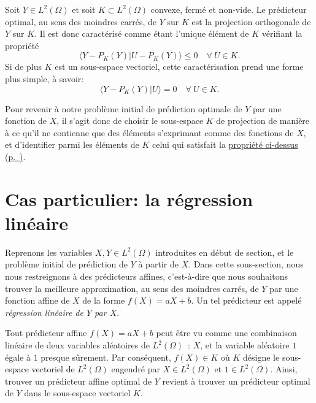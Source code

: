 \begin{proposition}\label{III-identEC}

Soit \(Y\in L^2(\Omega)\) et soit \(K \subset L^2(\Omega)\) convexe,
fermé et non-vide. Le prédicteur optimal, au sens des moindres carrés,
de \(Y\) sur \(K\) est la projection orthogonale de \(Y\) sur \(K\). Il
est donc caractérisé comme étant l'unique élément de \(K\) vérifiant la
propriété
\[ \langle Y - P_K(Y) \vert U - P_K(Y)\rangle \le 0 \quad  \forall ~U\in K.\]
Si de plus \(K\) est un sous-espace vectoriel, cette caractérisation
prend une forme plus simple, à savoir:
\[ \langle Y - P_K(Y) \vert U \rangle = 0 \quad  \forall ~U\in K.\]
\end{proposition}

Pour revenir à notre problème initial de prédiction optimale de \(Y\)
par une fonction de \(X\), il s'agit donc de choisir le sous-espace
\(K\) de projection de manière à ce qu'il ne contienne que des éléments
s'exprimant comme des fonctions de \(X\), et d'identifier parmi les
éléments de \(K\) celui qui satisfait la
\protect\hyperref[III-identEC]{propriété
ci-dessus (p.~\pageref*{III-identEC})}.

\section{Cas particulier: la régression
linéaire}\label{III-cas-particulier-la-ruxe9gression-linuxe9aire}

Reprenons les variables \(X,Y\in L^2(\Omega)\) introduites en début de
section, et le problème initial de prédiction de \(Y\) à partir de
\(X\). Dans cette sous-section, nous nous restreignons à des prédicteurs
affines, c'est-à-dire que nous souhaitons trouver la meilleure
approximation, au sens des moindres carrés, de \(Y\) par une fonction
affine de \(X\) de la forme \(f(X)=aX + b\). Un tel prédicteur est
appelé \emph{régression linéaire de \(Y\) par \(X\)}.

Tout prédicteur affine \(f(X)=aX+b\) peut être vu comme une combinaison
linéaire de deux variables aléatoires de \(L^2(\Omega)\)~: \(X\), et la
variable aléatoire \(1\) égale à \(1\) presque sûrement. Par conséquent,
\(f(X)\in K\) où \(K\) désigne le sous-espace vectoriel de
\(L^2(\Omega)\) engendré par \(X\in L^2(\Omega)\) et
\(1\in L^2(\Omega)\). Ainsi, trouver un prédicteur affine optimal de
\(Y\) revient à trouver un prédicteur optimal de \(Y\) dans le
sous-espace vectoriel \(K\).

